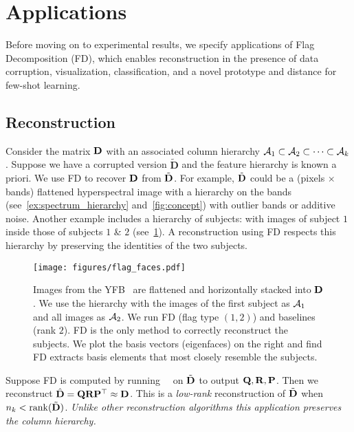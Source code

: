 \section{Applications}\label{sec:apps}
Before moving on to experimental results, we specify applications of Flag Decomposition (FD), which enables reconstruction in the presence of data corruption, visualization, classification, and a novel prototype and distance for few-shot learning. 

\subsection{Reconstruction}
Consider the matrix $\mathbf{D}$ with an associated column hierarchy $\mathcal{A}_1 \subset \mathcal{A}_2 \subset \cdots\subset  \mathcal{A}_k$. Suppose we have a corrupted version $\tilde{\mathbf{D}}$ and the feature hierarchy is known a priori. We use FD to recover $\mathbf{D}$ from $\tilde{\mathbf{D}}$. For example, $\tilde{\mathbf{D}}$ could be a (pixels $\times$ bands) flattened hyperspectral image with a hierarchy on the bands (see~\cref{ex:spectrum_hierarchy} and~\cref{fig:concept}) with outlier bands or additive noise. Another example includes a hierarchy of subjects: with images of subject $1$ inside those of subjects $1$ \& $2$ (see~\cref{fig:flag cartoon2}). A reconstruction using FD respects this hierarchy by preserving the identities of the two subjects.
\begin{figure}[t!]
    \centering
    \vspace{-4mm}
    \texttt{[image: figures/flag\_faces.pdf]}
    \footnotesize
    \caption{Images from the YFB~\cite{belhumeur1997eigenfaces} are flattened and horizontally stacked into $\mathbf{D}$. We use the hierarchy with the images of the first subject as $\mathcal{A}_1$ and all images as $\mathcal{A}_2$. We run FD (flag type $(1,2)$) and baselines (rank $2$). FD is the only method to correctly reconstruct the subjects. We plot the basis vectors (eigenfaces) on the right and find FD extracts basis elements that most closely resemble the subjects.}
    \vspace{-6mm}
    \label{fig:flag cartoon2}
\end{figure}


Suppose FD is computed by running~\algname~ on $\tilde{\mathbf{D}}$ to output $\mathbf{Q}, \mathbf{R}, \mathbf{P}$. Then we reconstruct $\hat{\mathbf{D}} = \mathbf{Q} \mathbf{R} \mathbf{P}^\top \approx \mathbf{D}$. This is a \textit{low-rank} reconstruction of $\tilde{\mathbf{D}}$ when $n_k < \mathrm{rank}(\tilde{\mathbf{D}})$. \emph{Unlike other reconstruction algorithms this application preserves the column hierarchy.}

